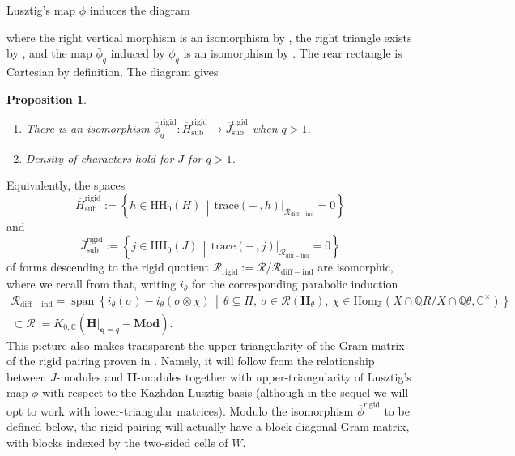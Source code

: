 \documentclass[10pt]{article}
\DeclareMathOperator{\spn}{span}
\newcommand{\sets}[2]{\left\{#1\,\middle|\,#2\right\}}
\newcommand{\HomOver}[3]{\mathrm{Hom}_{#1}(#2, #3)}
\newcommand{\Mod}{\mathbf{Mod}}
\newcommand{\HH}{\mathbf{H}}
\newcommand{\trace}[2]{\mathrm{trace}\left({#1}\,,{#2}\right)}
\newcommand{\Z}{\mathbb{Z}}
\newcommand{\C}{\mathbb{C}}
\newcommand{\Q}{\mathbb{Q}}
\newcommand{\bq}{\mathbf{q}}
\newtheorem{prop}{Proposition}
\theoremstyle{definition}
\theoremstyle{remark}
\newcommand{\Hrs}{\overline{H}^{\mathrm{rigid}}_{\mathrm{sub}}}
\newcommand{\phir}{\overline{\phi}^{\mathrm{rigid}}}
\newcommand{\Jrs}{\overline{J}^{\mathrm{rigid}}_{\mathrm{sub}}}
\newcommand{\RH}{\mathcal{R}}
\newcommand{\RHr}{\mathcal{R}_{\mathrm{rigid}}}
\newcommand{\RHdi}{\mathcal{R}_{\mathrm{diff-ind}}}
\newcommand{\hhh}{\mathrm{HH}_0}
\begin{document}
Lusztig's map $\phi$ induces the diagram
%
\begin{center}
\end{center}
%
where the right vertical morphism is an isomorphism by \cite{BDeligneKazhdanTrace}, the right triangle exists by \cite[Lemma 4]{Plancherel}, and 
the map $\bar{\phi}_q$ induced by $\phi_q$ is an isomorphism by \cite{BDD}. The rear rectangle is Cartesian by definition. The diagram gives
%
\begin{prop}
\label{prop phir isomorphism q>1 and density for J}
\begin{enumerate}
\item 
There is an isomorphism $\phir_q\colon\Hrs\to\Jrs$ when $q>1$.
%
\item
Density of characters hold for $J$ for $q>1$.
\end{enumerate}
\end{prop}
%
Equivalently, the spaces
%
\[
\Hrs:=\sets{h\in \hhh(H)}{\trace{-}{h}|_{\RHdi}=0}
\]
%
and 
%
\[
\Jrs:=\sets{j\in \hhh(J)}{\trace{-}{j}|_{\RHdi}=0}
\]
%
of forms descending to the rigid quotient $\RHr:=\RH/\RHdi$ are isomorphic, 
where we recall from \cite{CH} that, writing $i_\theta$ for the corresponding parabolic induction	 
%
\begin{multline*}
\RHdi=\spn{\sets{i_\theta(\sigma)-i_\theta(\sigma\otimes\chi)}{\theta\subsetneq\Pi,~\sigma\in\mathcal{R}(\HH_\theta),~\chi\in\HomOver{\Z}{X\cap\Q R/X\cap\Q \theta}{\C^\times}}}
\\
\subset
\RH:=K_{0,\C}(\HH|_{\bq=q}-\Mod).
\end{multline*}
%
This picture also makes transparent the upper-triangularity of the Gram matrix of the rigid pairing 
proven in \cite{CH}. Namely, it will follow from the relationship between $J$-modules and 
$\HH$-modules together with upper-triangularity of Lusztig's map $\phi$ with respect to the Kazhdan-Lusztig basis
(although in the sequel we will opt to work with lower-triangular matrices).
Modulo the isomorphism $\phir$ to be defined below, the rigid 
pairing will actually have a block diagonal Gram matrix, with blocks indexed by the two-sided cells of 
$W$. 
\end{document}
